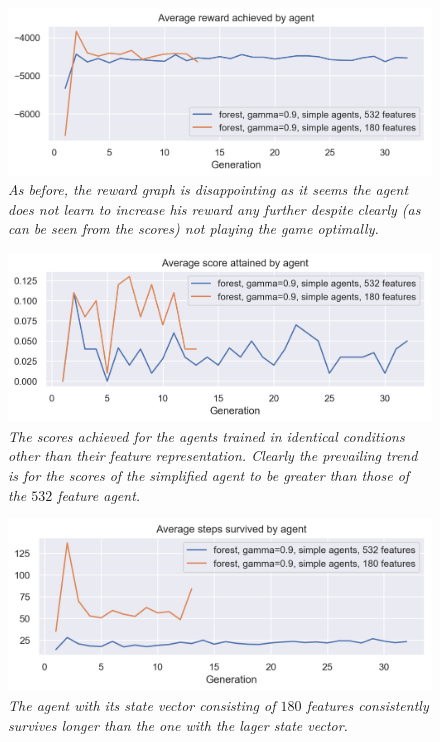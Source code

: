 \begin{figure}[!h]
\centering
	\includegraphics[width=\linewidth]{images/forest532_vs_forest180rew.png}
	\caption{\textit{As before, the reward graph is disappointing as it seems the agent does not learn to increase his reward any further despite clearly (as can be seen from the scores) not playing the game optimally.}}
	\label{forest532_vs_forest180rew}
\end{figure}

\begin{figure}[!h]
\centering
	\includegraphics[width=\linewidth]{images/forest532_vs_forest180sco.png}
	\caption{\textit{The scores achieved for the agents trained in identical conditions other than their feature representation. Clearly the prevailing trend is for the scores of the simplified agent to be greater than those of the $532$ feature agent.}}
	\label{forest532_vs_forest180sco}
\end{figure}

\begin{figure}[!h]
\centering
	\includegraphics[width=\linewidth]{images/forest532_vs_forest180ste.png}
	\caption{\textit{The agent with its state vector consisting of $180$ features consistently survives longer than the one with the lager state vector.}}
	\label{forest532_vs_forest180ste}
\end{figure}

